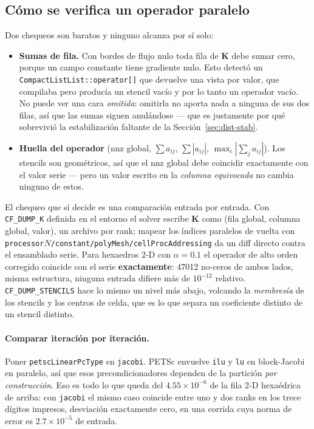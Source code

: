\documentclass[11pt,a4paper]{article}
\newcommand{\code}[1]{\texttt{\small #1}}
\newcommand{\Kstif}{\mathbf{K}}
\begin{document}
\subsection{Cómo se verifica un operador paralelo}
\label{sec:dist-verif}

Dos chequeos son baratos y ninguno alcanza por sí solo:

\begin{itemize}
  \item \textbf{Sumas de fila.} Con bordes de flujo nulo toda fila de $\Kstif$
        debe sumar cero, porque un campo constante tiene gradiente nulo. Esto
        detectó un \code{CompactListList::operator[]} que devuelve una vista por
        valor, que compilaba pero producía un stencil vacío y por lo tanto un
        operador vacío. No puede ver una cara \emph{omitida}: omitirla no aporta
        nada a ninguna de sus dos filas, así que las sumas siguen anulándose ---
        que es justamente por qué sobrevivió la estabilización faltante de la
        Sección~\ref{sec:dist-stab}.
  \item \textbf{Huella del operador} (nnz global, $\sum a_{ij}$,
        $\sum|a_{ij}|$, $\max_i|\sum_j a_{ij}|$). Los stencils son geométricos,
        así que el nnz global debe coincidir exactamente con el valor serie ---
        pero un valor escrito en la \emph{columna equivocada} no cambia ninguno
        de estos.
\end{itemize}

El chequeo que sí decide es una comparación entrada por entrada. Con
\code{CF\_DUMP\_K} definida en el entorno el solver escribe $\Kstif$ como (fila
global, columna global, valor), un archivo por rank; mapear los índices
paralelos de vuelta con
\code{processor$N$/constant/polyMesh/cellProcAddressing} da un diff directo
contra el ensamblado serie. Para hexaedros 2-D con $\alpha=0.1$ el operador de
alto orden corregido coincide con el serie \textbf{exactamente}: 47012 no-ceros
de ambos lados, misma estructura, ninguna entrada difiere más de $10^{-12}$
relativo. \code{CF\_DUMP\_STENCILS} hace lo mismo un nivel más abajo, volcando
la \emph{membresía} de los stencils y los centros de celda, que es lo que separa
un coeficiente distinto de un stencil distinto.

\paragraph{Comparar iteración por iteración.} Poner
\code{petscLinearPcType} en \code{jacobi}. PETSc envuelve \code{ilu} y \code{lu}
en block-Jacobi en paralelo, así que esos precondicionadores dependen de la
partición \emph{por construcción}. Eso es todo lo que queda del
$4.55\times10^{-6}$ de la fila 2-D hexaédrica de arriba: con \code{jacobi} el
mismo caso coincide entre uno y dos ranks en los trece dígitos impresos,
desviación exactamente cero, en una corrida cuya norma de error es
$2.7\times10^{-5}$ de entrada.
\end{document}
